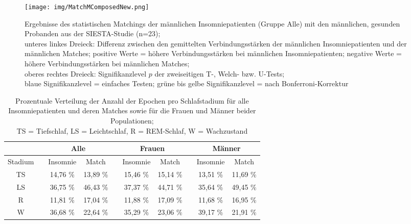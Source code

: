 \begin{figure}[H]
	\centering
	\texttt{[image: img/MatchMComposedNew.png]}
	\caption[Ergebnisse des statistischen Matchings der männlichen Insomniepatienten mit den gesunden Probanden]{Ergebnisse des statistischen Matchings der männlichen Insomniepatienten (Gruppe Alle) mit den männlichen, gesunden Probanden aus der SIESTA-Studie (n=23);\\unteres linkes Dreieck: Differenz zwischen den gemittelten Verbindungsstärken der männlichen Insomniepatienten und der männlichen Matches; positive Werte = höhere Verbindungsstärken bei männlichen Insomniepatienten; negative Werte = höhere Verbindungsstärken bei männlichen Matches;\\oberes rechtes Dreieck: Signifikanzlevel $p$ der zweiseitigen T-, Welch- bzw. U-Tests;\\blaue Signifikanzlevel = einfaches Testen; grüne bis gelbe Signifikanzlevel = nach Bonferroni-Korrektur}
	\label{fig:MatchMComposedNew}
\end{figure}




\begin{table}[H] 
\centering
\begin{tabularx}{0.96\textwidth}{cccccccccc}
\toprule
& & \multicolumn{2}{c}{\textbf{Alle}} & & \multicolumn{2}{c}{\textbf{Frauen}} & & \multicolumn{2}{c}{\textbf{Männer}}\\  
\midrule
Stadium & & Insomnie & Match & & Insomnie & Match & & Insomnie & Match\\
TS & & 14,76 \% & 13,89 \% & & 15,46 \% & 15,14 \% & & 13,51 \% & 11,69 \%\\
LS & & 36,75 \% & 46,43 \% & & 37,37 \% & 44,71 \% & & 35,64 \% & 49,45 \%\\
R & & 11,81 \% & 17,04 \% & & 11,88 \% & 17,09 \% & & 11,68 \% & 16,95 \%\\
W & & 36,68 \% & 22,64 \% & & 35,29 \% & 23,06 \% & & 39,17 \% & 21,91 \%\\
\bottomrule
\end{tabularx}
\caption[Prozentuale Verteilung der Schlafstadien]{Prozentuale Verteilung der Anzahl der Epochen pro Schlafstadium für alle Insomniepatienten und deren Matches sowie für die Frauen und Männer beider Populationen;\\TS = Tiefschlaf, LS = Leichtschlaf, R = \acs{REM}-Schlaf, W = Wachzustand}
\label{tab:nsis_insom_match}
\end{table}



